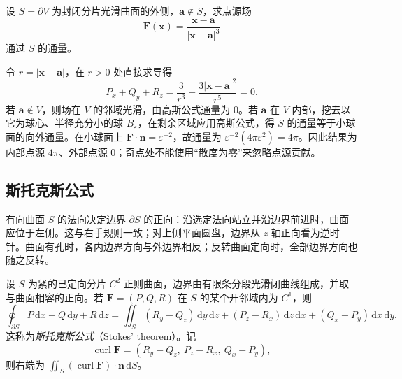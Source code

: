 \begin{example}
\label{ex:gauss-point-source-flux}
设 $S=\partial V$ 为封闭分片光滑曲面的外侧，$\boldsymbol a\notin S$，求点源场
\[
    \boldsymbol F(\boldsymbol x)=\frac{\boldsymbol x-\boldsymbol a}{|\boldsymbol x-\boldsymbol a|^3}
\]
通过 $S$ 的通量。
\end{example}
\begin{solve}
令 $r=|\boldsymbol x-\boldsymbol a|$，在 $r>0$ 处直接求导得
\[
    P_x+Q_y+R_z=\frac3{r^3}-\frac{3|\boldsymbol x-\boldsymbol a|^2}{r^5}=0.
\]
若 $\boldsymbol a\notin V$，则场在 $V$ 的邻域光滑，由高斯公式通量为 $0$。若 $\boldsymbol a$ 在 $V$ 内部，挖去以它为球心、半径充分小的球 $B_\varepsilon$，在剩余区域应用高斯公式，得 $S$ 的通量等于小球面的向外通量。在小球面上 $\boldsymbol F\cdot\boldsymbol n=\varepsilon^{-2}$，故通量为 $\varepsilon^{-2}(4\pi\varepsilon^2)=4\pi$。因此结果为内部点源 $4\pi$、外部点源 $0$；奇点处不能使用“散度为零”来忽略点源贡献。
\end{solve}

\subsection{斯托克斯公式}
\label{subsec:stokes-formula}

有向曲面 $S$ 的法向决定边界 $\partial S$ 的正向：沿选定法向站立并沿边界前进时，曲面应位于左侧。这与右手规则一致；对上侧平面圆盘，边界从 $z$ 轴正向看为逆时针。曲面有孔时，各内边界方向与外边界相反；反转曲面定向时，全部边界方向也随之反转。

\begin{theorem}[斯托克斯公式]
\label{thm:stokes-formula}
设 $S$ 为紧的已定向分片 $C^2$ 正则曲面，边界由有限条分段光滑闭曲线组成，并取与曲面相容的正向。若 $\boldsymbol F=(P,Q,R)$ 在 $S$ 的某个开邻域内为 $C^1$，则
\begin{equation}
\label{eq:stokes-formula}
    \oint_{\partial S}P\,\mathrm dx+Q\,\mathrm dy+R\,\mathrm dz
    =\iint_S(R_y-Q_z)\,\mathrm dy\,\mathrm dz
      +(P_z-R_x)\,\mathrm dz\,\mathrm dx
      +(Q_x-P_y)\,\mathrm dx\,\mathrm dy.
\end{equation}
这称为\emph{斯托克斯公式}（Stokes' theorem）。记
\[
    \operatorname{curl}\boldsymbol F=(R_y-Q_z,\ P_z-R_x,\ Q_x-P_y),
\]
则右端为 $\iint_S(\operatorname{curl}\boldsymbol F)\cdot\boldsymbol n\,\mathrm dS$。
\end{theorem}

